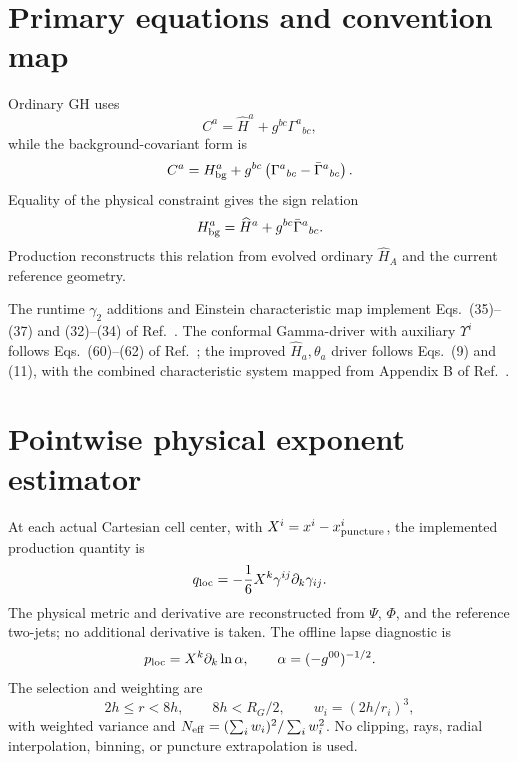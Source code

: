\documentclass[11pt]{article}
\begin{document}
\section{Primary equations and convention map}

Ordinary GH uses
\begin{equation}
 C^a=\widehat H^a+g^{bc}\Gamma^a{}_{bc},
\end{equation}
while the background-covariant form is
\begin{equation}
 C^a=H_{\rm bg}^a+g^{bc}
       \left(\Gamma^a{}_{bc}-\bar\Gamma^a{}_{bc}\right).
\end{equation}
Equality of the physical constraint gives the sign relation
\begin{equation}
 H_{\rm bg}^a=\widehat H^a+g^{bc}\bar\Gamma^a{}_{bc}.
\end{equation}
Production reconstructs this relation from evolved ordinary
$\widehat H_A$ and the current reference geometry.

The runtime $\gamma_2$ additions and Einstein characteristic map implement
Eqs.~(35)--(37) and (32)--(34) of Ref.~\cite{lindblom2006}. The conformal
Gamma-driver with auxiliary $\Upsilon^i$ follows Eqs.~(60)--(62) of
Ref.~\cite{lindblom2008}; the improved $\widehat H_a,\theta_a$ driver follows
Eqs.~(9) and (11), with the combined characteristic system mapped from
Appendix B of Ref.~\cite{lindblom2009}.

\section{Pointwise physical exponent estimator}

At each actual Cartesian cell center, with $X^i=x^i-x^i_{\rm puncture}$,
the implemented production quantity is
\begin{equation}
 q_{\rm loc}=-\frac{1}{6}X^k\gamma^{ij}\partial_k\gamma_{ij}.
\end{equation}
The physical metric and derivative are reconstructed from $\Psi$, $\Phi$, and
the reference two-jets; no additional derivative is taken.  The offline lapse
diagnostic is
\begin{equation}
 p_{\rm loc}=X^k\partial_k\ln\alpha,
 \qquad \alpha=(-g^{00})^{-1/2}.
\end{equation}
The selection and weighting are
\begin{equation}
 2h\le r<8h,\qquad 8h<R_G/2,\qquad
 w_i=(2h/r_i)^3,
\end{equation}
with weighted variance and
$N_{\rm eff}=(\sum_iw_i)^2/\sum_iw_i^2$.  No clipping, rays, radial
interpolation, binning, or puncture extrapolation is used.
\end{document}

